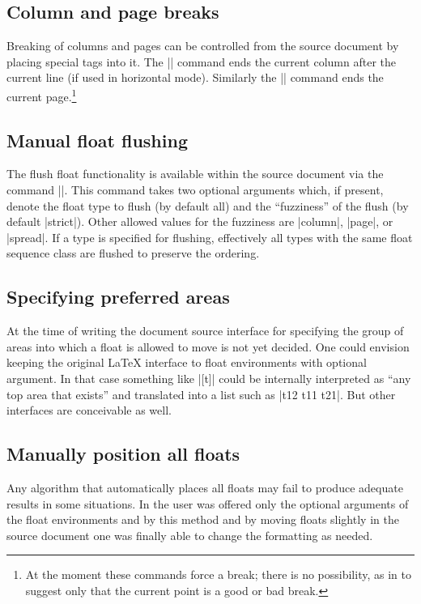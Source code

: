 \documentclass[twocolumn]{article}
\begin{document}
\subsection{Column and page breaks}

Breaking of columns and pages can be controlled from the source
document by placing special tags into it. The |\columnbreak| command
ends the current column after the current line (if used in horizontal
mode). Similarly the |\pagebreak| command ends the current
page.\footnote{At the moment these commands force a break; there is no
possibility, as in \LaTeXe{} to suggest only that the current point
is a good  or bad break.}


\subsection{Manual float flushing}

The flush float functionality is available within the source document
via the command |\flushfloats|. This command takes two optional arguments
which, if present, denote the float type to flush (by default all) and the
``fuzziness'' of the flush (by default |strict|). Other allowed values
for the fuzziness are |column|, |page|, or |spread|. If a type is
specified for flushing, effectively all types with the same float
sequence class are flushed to preserve the ordering.



\subsection{Specifying preferred areas}

At the time of writing the document source interface for specifying
the group of areas into which a float is allowed to move is not yet
decided. One could envision keeping the original \LaTeX{} interface to
float environments with optional argument. In that case something like
|[t]| could be internally interpreted as ``any top area that exists''
and translated into a list such as |t12 t11 t21|. But other interfaces
are conceivable as well.



\subsection{Manually position all floats}

Any algorithm that automatically places all floats may fail to produce
adequate results in some situations. In \LaTeXe{} the user was offered
only the optional arguments of the float environments and by this
method and by moving floats slightly in the source document one was
finally able to change the formatting as needed.
\end{document}

